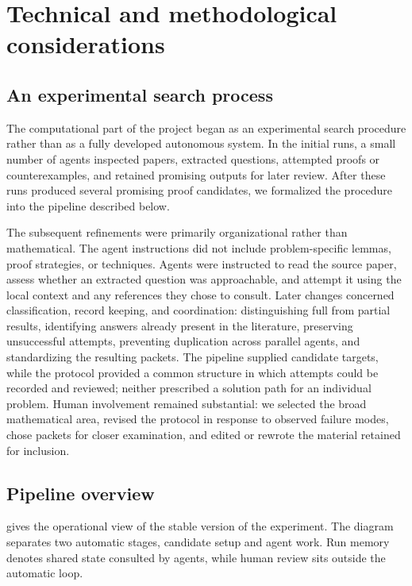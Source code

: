 \documentclass[11pt,reqno]{amsart}
\theoremstyle{plain}
\theoremstyle{definition}
\begin{document}
\section{Technical and methodological considerations}
\label{sec:technical-details-pipeline}

\subsection{An experimental search process}

The computational part of the project began as an experimental search procedure rather than as a fully developed autonomous system. In the initial runs, a small number of agents inspected papers, extracted questions, attempted proofs or counterexamples, and retained promising outputs for later review. After these runs produced several promising proof candidates, we formalized the procedure into the pipeline described below.

The subsequent refinements were primarily organizational rather than mathematical. The agent instructions did not include problem-specific lemmas, proof strategies, or techniques. Agents were instructed to read the source paper, assess whether an extracted question was approachable, and attempt it using the local context and any references they chose to consult. Later changes concerned classification, record keeping, and coordination: distinguishing full from partial results, identifying answers already present in the literature, preserving unsuccessful attempts, preventing duplication across parallel agents, and standardizing the resulting packets. The pipeline supplied candidate targets, while the protocol provided a common structure in which attempts could be recorded and reviewed; neither prescribed a solution path for an individual problem. Human involvement remained substantial: we selected the broad mathematical area, revised the protocol in response to observed failure modes, chose packets for closer examination, and edited or rewrote the material retained for inclusion.

\subsection{Pipeline overview}

 gives the operational view of the stable version of the experiment.  The diagram separates two automatic stages, candidate setup and agent work. Run memory denotes shared state consulted by agents, while human review sits outside the automatic loop.
\end{document}
